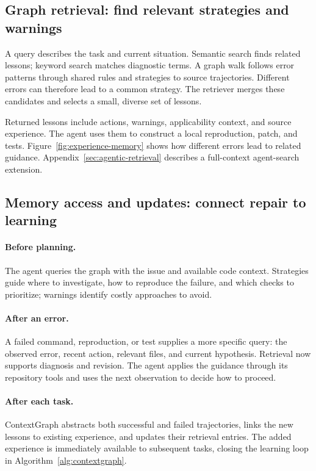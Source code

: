 \subsection{Graph retrieval: find relevant strategies and warnings}
\label{sec:experience-retrieval}
A query describes the task and current situation. Semantic search finds
related lessons; keyword search matches diagnostic terms. A graph walk follows
error patterns through shared rules and strategies to source trajectories.
Different errors can therefore lead to a common strategy. The retriever merges
these candidates and selects a small, diverse set of lessons.

Returned lessons include actions, warnings, applicability context, and source
experience. The agent uses them to construct a local reproduction, patch, and
tests. Figure~\ref{fig:experience-memory} shows how different errors lead to
related guidance. Appendix~\ref{sec:agentic-retrieval} describes a full-context
agent-search extension.

\subsection{Memory access and updates: connect repair to learning}
\label{sec:experience-access}
\paragraph{Before planning.}
The agent queries the graph with the issue and available code context.
Strategies guide where to investigate, how to reproduce the failure, and
which checks to prioritize; warnings identify costly approaches to avoid.

\paragraph{After an error.}
A failed command, reproduction, or test supplies a more specific query:
the observed error, recent action, relevant files, and current hypothesis.
Retrieval now supports diagnosis and revision. The agent applies the guidance
through its repository tools and uses the next observation to decide how to proceed.

\paragraph{After each task.}
ContextGraph abstracts both successful and failed trajectories, links the
new lessons to existing experience, and updates their retrieval entries.
The added experience is immediately available to subsequent tasks, closing
the learning loop in Algorithm~\ref{alg:contextgraph}.

